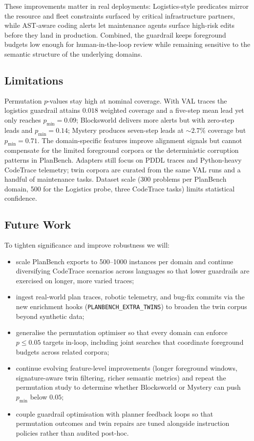 \documentclass[11pt]{article}
\begin{document}
These improvements matter in real deployments: Logistics-style predicates mirror
the resource and fleet constraints surfaced by critical infrastructure partners,
while AST-aware coding alerts let maintenance agents surface high-risk edits
before they land in production. Combined, the guardrail keeps foreground budgets
low enough for human-in-the-loop review while remaining sensitive to the semantic
structure of the underlying domains.

\subsection{Limitations}
Permutation $p$-values stay high at nominal coverage. With VAL traces the
logistics guardrail attains $0.018$ weighted coverage and a five-step mean lead
yet only reaches $p_{\min}=0.09$; Blocksworld delivers more alerts but with
zero-step leads and $p_{\min}=0.14$; Mystery produces seven-step leads at
${\sim}2.7\%$ coverage but $p_{\min}=0.71$. The domain-specific features improve
alignment signals but cannot compensate for the limited foreground corpora or
the deterministic corruption patterns in PlanBench. Adapters still focus on PDDL
traces and Python-heavy CodeTrace telemetry; twin corpora are curated from the
same VAL runs and a handful of maintenance tasks. Dataset scale (300 problems per
PlanBench domain, 500 for the Logistics probe, three CodeTrace tasks) limits
statistical confidence.

\subsection{Future Work}
To tighten significance and improve robustness we will:
\begin{itemize}
  \item scale PlanBench exports to 500--1000 instances per domain and continue
        diversifying CodeTrace scenarios across languages so that lower
        guardrails are exercised on longer, more varied traces;
  \item ingest real-world plan traces, robotic telemetry, and bug-fix commits
        via the new enrichment hooks (\texttt{PLANBENCH\_EXTRA\_TWINS}) to broaden the
        twin corpus beyond synthetic data;
  \item generalise the permutation optimiser so that every domain can enforce
        $p \le 0.05$ targets in-loop, including joint searches that coordinate
        foreground budgets across related corpora;
  \item continue evolving feature-level improvements (longer foreground windows,
        signature-aware twin filtering, richer semantic metrics) and repeat the
        permutation study to determine whether Blocksworld or Mystery can push
        $p_{\min}$ below $0.05$;
  \item couple guardrail optimisation with planner feedback loops so that
        permutation outcomes and twin repairs are tuned alongside instruction
        policies rather than audited post-hoc.
\end{itemize}
\end{document}
